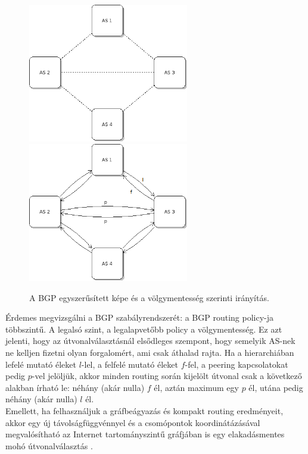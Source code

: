   \begin{figure}[!ht]
    \centering
    \includegraphics[width=70mm,keepaspectratio=true]{./figures/BGP_iranyitatlan.png}\hspace{5mm}
    \includegraphics[width=70mm,keepaspectratio=true]{./figures/BGP_iranyitott_labeled.png}

    \caption{A BGP egyszerűsített képe és a völgymentesség szerinti irányítás.}
    \label{fig:figure_BGP}
  \end{figure}

  Érdemes megvizsgálni a BGP szabályrendszerét: a BGP routing policy-ja többszintű. A legalsó szint, a legalapvetőbb policy a völgymentesség. Ez azt jelenti, hogy az útvonalválasztásnál elsődleges szempont, hogy semelyik AS-nek ne kelljen fizetni olyan forgalomért, ami csak áthalad rajta. Ha a hierarchiában lefelé mutató éleket $l$-lel, a felfelé mutató éleket $f$-fel, a peering kapcsolatokat pedig $p$-vel jelöljük, akkor minden routing során kijelölt útvonal csak a következő alakban írható le: néhány (akár nulla) $f$ él, aztán maximum egy $p$ él, utána pedig néhány (akár nulla) $l$ él.\\

  Emellett, ha felhasználjuk a gráfbeágyazás és kompakt routing eredményeit, akkor egy új távolságfüggvénnyel és a csomópontok koordinátázásával megvalósítható az Internet tartományszintű gráfjában is egy elakadásmentes mohó útvonalválasztás \cite{DobreiBScSzakdolgozat}. 

